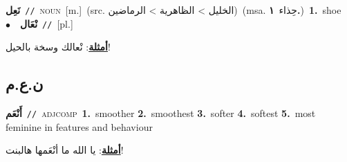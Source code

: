 \documentclass[10pt,a4paper,twoside]{article} %
\begin{document}
\begin{multicols}{2}
{\setlength\topsep{0pt}\textbf{\foreignlanguage{arabic}{نَعِل}}\ {\color{gray}\texttt{//}\color{black}}\ \textsc{noun}\ [m.]\ (src. \color{gray}\foreignlanguage{arabic}{الخليل > الظاهرية > الرماضين}\color{black})\ \color{gray}(msa. \foreignlanguage{arabic}{حِذاء}~\foreignlanguage{arabic}{\textbf{١.}})\color{black}\ \textbf{1.}~shoe\ \ $\bullet$\ \ \setlength\topsep{0pt}\textbf{\foreignlanguage{arabic}{نْعَال}}\ {\color{gray}\texttt{//}\color{black}}\ [pl.]\  \begin{flushright}\color{gray}\foreignlanguage{arabic}{\textbf{\underline{\foreignlanguage{arabic}{أمثلة}}}: نْعالك وسخة بالحيل!}\end{flushright}\color{black}} \vspace{2mm}

\vspace{-3mm}
\subsection*{\color{blue}\foreignlanguage{arabic}{ن.ع.م}\color{blue}{}} 

{\setlength\topsep{0pt}\textbf{\foreignlanguage{arabic}{أَنْعَم}}\ {\color{gray}\texttt{//}\color{black}}\ \textsc{adj\textunderscore comp}\ \textbf{1.}~smoother  \textbf{2.}~smoothest  \textbf{3.}~softer  \textbf{4.}~softest  \textbf{5.}~most feminine  in features and behaviour\  \begin{flushright}\color{gray}\foreignlanguage{arabic}{\textbf{\underline{\foreignlanguage{arabic}{أمثلة}}}: يا الله ما أنْعَمها هالبنت!}\end{flushright}\color{black}} \vspace{2mm}


\end{multicols}
\end{document}
